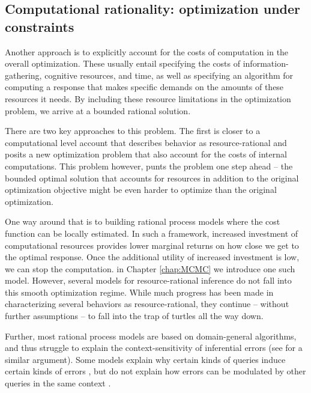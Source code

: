 \subsection{Computational rationality: optimization under constraints}

Another approach is to explicitly account for the costs of computation in the overall optimization. These usually entail specifying the costs of information-gathering, cognitive resources, and time, as well as specifying an algorithm for computing a response that makes specific demands on the amounts of these resources it needs. By including these resource limitations in the optimization problem, we arrive at a bounded rational solution.

There are two key approaches to this problem. The first is closer to a computational level account that describes behavior as resource-rational \citep{Vul2014,griffiths2015, schulz2016simple} and posits a new optimization problem that also account for the costs of internal computations. This problem however, punts the problem one step ahead -- the bounded optimal solution that accounts for resources in addition to the original optimization objective might be even harder to optimize than the original optimization.

One way around that is to building rational process models where the cost function can be locally estimated. In such a framework, increased investment of computational resources provides lower marginal returns on how close we get to the optimal response\cite{gershman15}. Once the additional utility of increased investment is low, we can stop the computation. in Chapter \ref{chap:MCMC} we introduce one such model. However, several models for resource-rational inference do not fall into this smooth optimization regime. While much progress has been made in characterizing several behaviors as resource-rational, they continue -- without further assumptions -- to fall into the trap of turtles all the way down.

Further, most rational process models are based on domain-general algorithms, and thus struggle to explain the context-sensitivity of inferential errors (see \citet{mercier2017enigma} for a similar argument). Some models explain why certain kinds of queries induce certain kinds of errors \citep{dasgupta2017hypotheses}, but do not explain how errors can be modulated by other queries in the same context \citep{gershman2014amortized,dasgupta2018remembrance}. 



